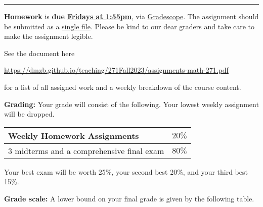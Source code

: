 \documentclass[12pt]{article}
\begin{document}
\hrule
\medskip

\noindent \textbf{Homework} is \textbf{due \underline{Fridays at 1:55pm}}, via \underline{Gradescope}. The assignment should be submitted as a \underline{single file}. Please be kind to our dear graders and take care to make the assignment legible.
\smallskip

\noindent See the document here
\begin{center}
  \url{https://dmzb.github.io/teaching/271Fall2023/assignments-math-271.pdf}
\end{center}
for a list of all assigned work and a weekly breakdown of the course content.
\medskip






\noindent\textbf{Grading:} 
Your grade will consist of the following. Your lowest weekly assignment will be dropped.

\begin{center}
  \begin{tabular}{|l|l|}
    \hline
    Weekly Homework Assignments & $20\%$ \\
    \hline    
    3 midterms and a comprehensive final exam  & $80\%$ 	 \\
    \hline
  \end{tabular}
\end{center}
Your best exam will be worth 25\%, your second best 20\%, and your third best 15\%.

\vspace*{.15in}
\noindent\textbf{Grade scale:} 
A lower bound on your final grade is given by the following table. 
\end{document}
